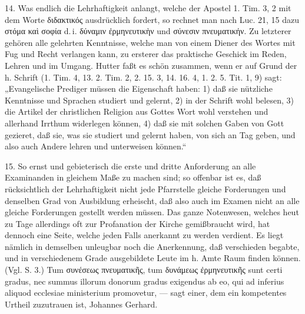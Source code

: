14. Was endlich die Lehrhaftigkeit anlangt, welche der Apostel 1. Tim. 3, 2 mit dem Worte διδακτικός ausdrücklich fordert, so rechnet man nach Luc. 21, 15 dazu στόμα καὶ σοφία d.\,i. δύναμιν ἐρμηνευτικὴν und σύνεσιν πνευματικήν. Zu letzterer gehören alle gelehrten Kenntnisse, welche man von einem Diener des Wortes mit Fug und Recht verlangen kann, zu ersterer das praktische Geschick im Reden, Lehren und im Umgang. Hutter faßt es schön zusammen, wenn er auf Grund der h. Schrift (1. Tim. 4, 13. 2. Tim. 2, 2. 15. 3, 14. 16. 4, 1. 2. 5. Tit. 1, 9) sagt: „Evangelische Prediger müssen die Eigenschaft haben: 1) daß sie nützliche Kenntnisse und Sprachen studiert und gelernt, 2) in der Schrift wohl belesen, 3) die Artikel der christlichen Religion aus Gottes Wort wohl verstehen und allerhand Irrthum widerlegen können, 4) daß sie mit solchen Gaben von Gott gezieret, daß sie, was sie studiert und gelernt haben, von sich an Tag geben, und also auch Andere lehren und unterweisen können.“

15. So ernst und gebieterisch die erste und dritte Anforderung an alle Examinanden in gleichem Maße zu machen sind; so offenbar ist es, daß rücksichtlich der Lehrhaftigkeit nicht jede Pfarrstelle gleiche Forderungen und denselben Grad von Ausbildung erheischt, daß also auch im Examen nicht an alle gleiche Forderungen gestellt werden müssen. Das ganze Notenwesen, welches heut zu Tage allerdings oft zur Profanation der Kirche gemißbraucht wird, hat dennoch eine Seite, welche jeden Falls anerkannt
zu werden verdient. Es liegt nämlich in demselben unleugbar noch die Anerkennung, daß verschieden begabte, und in verschiedenem Grade ausgebildete Leute im h. Amte Raum finden können. (Vgl. S. 3.) Tum συνέσεως πνευματικῆς, tum δυνάμεως ἐρμηνευτικῆς sunt certi gradus, nec summus illorum donorum gradus exigendus ab eo, qui ad inferius aliquod ecclesiae ministerium promovetur, — sagt einer, dem ein kompetentes Urtheil zuzutrauen ist, Johannes Gerhard.

